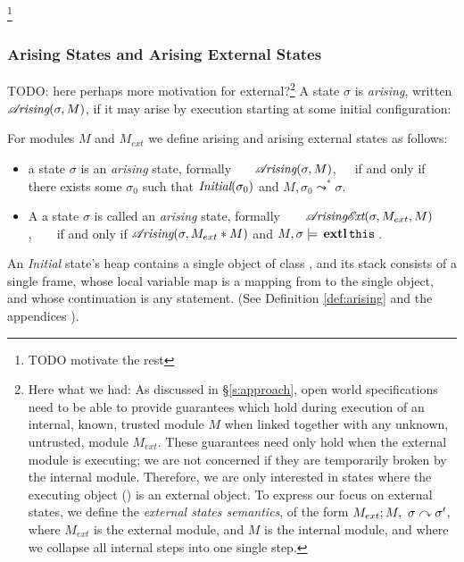 \footnote{TODO motivate the rest}
\subsubsection{Arising States and {Arising} External States}

{TODO: here perhaps more motivation for external?\footnote{Here what we had: As discussed in \S \ref{s:approach}, 
{open world specifications need to be able to provide}
guarantees which hold
during execution of an internal, 
known, trusted module $M$ when linked together with any
unknown, untrusted, module $M_{ext}$. These guarantees need only hold 
when the external module is executing; we are not concerned if they are
temporarily broken by the internal module. Therefore, we are only interested in states where the
executing object () is an external object. 
To express our focus on external states, we define the  \emph{external states semantics}, of the form 
$M_{ext} ; M,\ \sigma \curvearrowright \sigma'$, where $M_{ext}$ is the external
module, and $M$ is the internal module, and where we
collapse all internal steps into one single step.
}}
{A state $\sigma$ is \emph{arising},}  written $\mathcal{A}\!\textit{rising}(\sigma, M)$, {if it  may arise}  %
by execution
starting at some initial configuration:


\begin{definition}
\label{def:arising}
For modules $M$ and $M_{ext}$ we define arising and arising external states as follows:

\begin{itemize}
\item
 a state $\sigma$ is 
{ an \emph{arising} state, formally \ \ \  $\mathcal{A}\!\textit{rising}(\sigma, M)$,\ \ \ 
if and only if there exists some $\sigma_0$ such that $\textit{Initial}(\sigma_0)$ and
$M, {\sigma_0} \leadsto^* {\sigma}$.}
\item
{A a state $\sigma$ is 
called an \emph{arising} state, formally\ \ \ \  $\mathcal{A}\!\textit{rising}{\mathcal{E}\!\textit{xt}(\sigma, M_{ext}, M)}$,\ \ \ \
if and only if $\mathcal{A}\!\textit{rising}(\sigma, M_{ext}*M)$ and $M, \sigma \models \external{}$.}
\end{itemize}
\end{definition}


An \emph{Initial} state's heap contains a single object of class , and
its  stack   consists of a single frame, whose local variable map is a
mapping from \prg{this} to the single object, and whose continuation is  any statement.
(See Definition %
\ref{def:arising} and the 
{appendices %
\cite{necessityFull}).}


